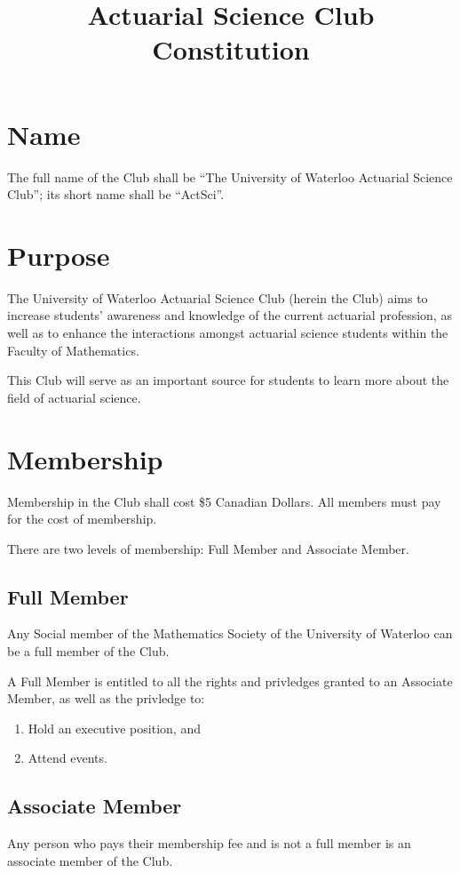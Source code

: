 \documentclass[11pt]{mathsoc}
\title{Actuarial Science Club Constitution}
\begin{document}

\setcounter{tocdepth}{4}
{\large \tableofcontents}

\newpage

\section{Name}
The full name of the Club shall be “The University of Waterloo Actuarial 
Science Club”; its short name shall be “ActSci”.

\section{Purpose}
The University of Waterloo Actuarial Science Club (herein the Club)  
aims to increase students’ awareness and knowledge of the current actuarial 
profession, as well as to enhance the interactions amongst actuarial science 
students within the Faculty of Mathematics.  

This Club will serve as an important source for students to learn more about 
the field of actuarial science.  

\section{Membership}
Membership in the Club shall cost \$5 Canadian Dollars. All members must
pay for the cost of membership.

There are two levels of membership: Full Member and Associate Member.  

\subsection{Full Member}
Any Social member of the Mathematics Society of the University of 
Waterloo can be a full member of the Club. 

A Full Member is entitled to all the rights and privledges granted 
to an Associate Member, as well as the privledge to:
\begin{enumerate}
    \item Hold an executive position, and
    \item Attend events.
\end{enumerate}

\subsection{Associate Member}
Any person who pays their membership fee and is not a full member is an 
associate member of the Club. 
\end{document}
